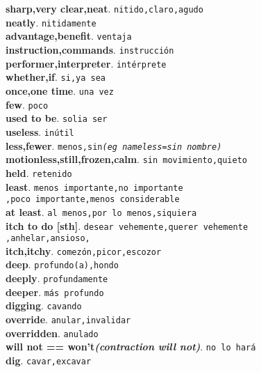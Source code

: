 \documentclass[twocolumn]{article}
\begin{document}
	\textsf{\textbf{sharp,very clear,neat}}. \texttt{nitido,claro,agudo}\\
	\textsf{\textbf{neatly}}. \texttt{nitidamente}\\
	\textsf{\textbf{advantage,benefit}}. \texttt{ventaja}\\
	\textsf{\textbf{instruction,commands}}. \texttt{instrucci\'on}\\
	\textsf{\textbf{performer,interpreter}}. \texttt{int\'erprete}\\
	\textsf{\textbf{whether,if}}. \texttt{si,ya sea}\\
	\textsf{\textbf{once,one time}}. \texttt{una vez}\\
	\textsf{\textbf{few}}. \texttt{poco}\\
	\textsf{\textbf{used to be}}. \texttt{solia ser}\\
	\textsf{\textbf{useless}}. \texttt{in\'util}\\
	\textsf{\textbf{less,fewer}}. \texttt{menos,sin{\scriptsize \textsl{(eg nameless=sin nombre)}}}\\
	\textsf{\textbf{motionless,still,frozen,calm}}. \texttt{sin movimiento,quieto}\\
	\textsf{\textbf{held}}. \texttt{retenido}\\
	\textsf{\textbf{least}}. \texttt{menos importante,no importante\\,poco importante,menos considerable}\\
	\textsf{\textbf{at least}}. \texttt{al menos,por lo menos,siquiera}\\
  \textsf{\textbf{itch to do [sth]}}. \texttt{desear vehemente,querer vehemente\\,anhelar,ansioso,}\\
  \textsf{\textbf{itch,itchy}}. \texttt{comez\'on,picor,escozor}\\
	\textsf{\textbf{deep}}. \texttt{profundo(a),hondo}\\
	\textsf{\textbf{deeply}}. \texttt{profundamente}\\
	\textsf{\textbf{deeper}}. \texttt{m\'as profundo}\\
	\textsf{\textbf{digging}}. \texttt{cavando}\\
	\textsf{\textbf{override}}. \texttt{anular,invalidar}\\
	\textsf{\textbf{overridden}}. \texttt{anulado}\\
	\textsf{\textbf{will not == won't{\scriptsize \textsl{(contraction will not)}}}}. \texttt{no lo har\'a}\\
	\textsf{\textbf{dig}}. \texttt{cavar,excavar}\\
\end{document}
